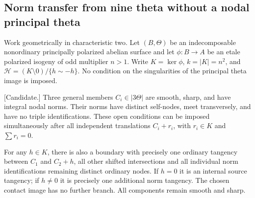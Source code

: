 \subsection{Norm transfer from nine theta without a nodal principal theta}
\label{subsec:nine-theta-norm-transfer-candidate}

Work geometrically in characteristic two. Let $(B,\Theta)$ be an
indecomposable nonordinary principally polarized abelian surface and
let $\phi:B\to A$ be an etale polarized isogeny of odd multiplier
$n>1$. Write $K=\ker\phi$, $k=|K|=n^2$, and
$\mathcal H=(K\setminus0)/\{h\sim-h\}$. No condition on the
singularities of the principal theta image is imposed.

\begin{lemma}
\label{lem:nine-theta-clean-cubic-contacts-candidate}
\textup{[Candidate.]}
Three general members $C_i\in|3\Theta|$ are smooth, sharp, and
have integral nodal norms. Their norms have distinct self-nodes,
meet transversely, and have no triple identifications. These open
conditions can be imposed simultaneously after all independent
translations $C_i+r_i$, with $r_i\in K$ and $\sum r_i=0$.

For any $h\in K$, there is also a boundary with precisely one
ordinary tangency between $C_1$ and $C_2+h$, all other shifted
intersections and all individual norm identifications remaining
distinct ordinary nodes. If $h=0$ it is an internal source
tangency; if $h\ne0$ it is precisely one additional norm tangency.
The chosen contact image has no further branch. All components
remain smooth and sharp.
\end{lemma}

